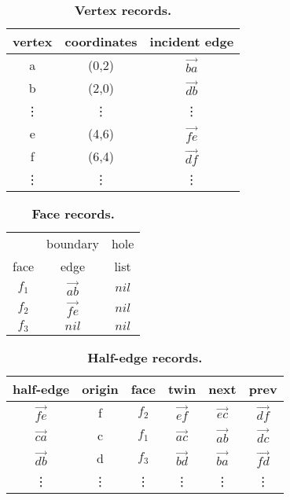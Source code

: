 \documentclass[a4paper,10pt]{article}
\begin{document}
    \begin{table*}[h!]
	\small
	\centering
	\caption{\textbf{Vertex records.}}\label{tab:vertices}
	\begin{tabular}{c c c}
	    \toprule
	    vertex & coordinates & incident edge \\
	    \midrule
	    a      & (0,2)  & $\vec{ba}$ \\
	    b      & (2,0)  & $\vec{db}$ \\
	    \vdots & \vdots & \vdots     \\
	    e      & (4,6)  & $\vec{fe}$ \\
	    f      & (6,4)  & $\vec{df}$ \\
	    \vdots & \vdots & \vdots \\
	    \bottomrule
	\end{tabular}
    \end{table*}

    \begin{table*}[h!]
	\small
	\centering
	\caption{\textbf{Face records.}}\label{tab:faces}
	\begin{tabular}{c c c}
	    \toprule
		& boundary  & hole\\
	    face & edge      & list\\
	    \midrule
	    $f_1$ & $\vec{ab}$ & $nil$ \\
	    $f_2$ & $\vec{fe}$ & $nil$ \\
	    $f_3$ & $nil$      & $nil$ \\
	    \bottomrule
	\end{tabular}
    \end{table*}

    \begin{table*}[h!]
	\small
	\centering
	\caption{\textbf{Half-edge records.}}\label{tab:hedges}
	\begin{tabular}{c c c c c c}
	    \toprule
	    half-edge & origin & face & twin & next & prev \\
	    \midrule
	    $\vec{fe}$ & f & $f_2$  & $\vec{ef}$ & $\vec{ec}$ & $\vec{df}$ \\
	    $\vec{ca}$ & c & $f_1$  & $\vec{ac}$ & $\vec{ab}$ & $\vec{dc}$ \\
	    $\vec{db}$ & d & $f_3$  & $\vec{bd}$ & $\vec{ba}$ & $\vec{fd}$ \\
	    \vdots     & \vdots & \vdots & \vdots     & \vdots     & \vdots     \\
	    \bottomrule
	\end{tabular}
    \end{table*}
\end{document}
